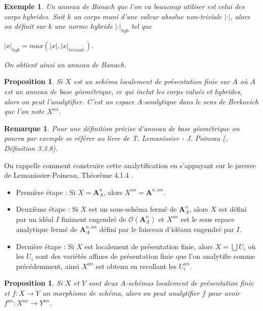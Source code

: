 \documentclass[11pt]{article}
\newcommand{\ana}{\mathbf{A}}
\newtheorem{prop}[thm]{Proposition}
\newtheorem{rem}[thm]{Remarque}
\newtheorem{ex}[thm]{Exemple}
\begin{document}
\begin{ex}
Un anneau de Banach que l'on va beaucoup utiliser est celui des corps hybrides. Soit $k$ un corps muni d'une valeur absolue non-triviale $|\cdot|$, alors on définit sur $k$ une norme hybride $|\cdot|_{hyb}$ tel que  
\begin{center}
$|x|_{hyb} = max(|x|, |x|_{triviale})$.
\end{center}
On obtient ainsi un anneau de Banach. 
\end{ex}

\begin{prop}
Si $X$ est un schéma localement de présentation finie sur $A$ où $A$ est un anneau de base géométrique, ce qui inclut les corps valués et hybrides, alors on peut l'analytifier. C'est un espace $A$-analytique dans le sens de Berkovich que l'on note $X^{an}$.
\end{prop}

\begin{rem}
Pour une définition précise d'anneau de base géométrique on pourra par exemple se référer au livre de T. Lemanissier - J. Poineau (\cite{LemanissierPoineau}, Définition 3.3.8).
\end{rem}

On rappelle comment construire cette analytification en s'appuyant sur le preuve de Lemanissier-Poineau, Théorème 4.1.4 \cite{LemanissierPoineau}.

\begin{itemize}
\item Première étape : Si $X = \ana^n_A$, alors $X^{an} = \ana^{n,an}$.

\item Deuxième étape : Si $X$ est un sous-schéma fermé de $\ana^n_A$, alors $X$ est défini par un idéal $I$ finiment engendré de $\mathcal{O}(\ana^n_A)$ et $X^{an}$ est le sous espace analytique fermé de $\ana^{n,an}_A$ défini par le faisceau d'idéaux engendré par $I$. 

\item Dernière étape : Si $X$ est localement de présentation finie, alors $X = \bigcup U_i$ où les $U_i$ sont des variétés affines de présentation finie que l'on analytifie comme précédemment, ainsi $X^{an}$ est obtenu en recollant les $U_i^{an}$.
\end{itemize}

\begin{prop}
Si $X$ et $Y$ sont deux $A$-schémas localement de présentation finie et $f : X \rightarrow Y$ un morphisme de schéma, alors on peut analytifier $f$ pour avoir $f^{an} : X^{an} \rightarrow Y^{an}$.
\end{prop}
\end{document}
